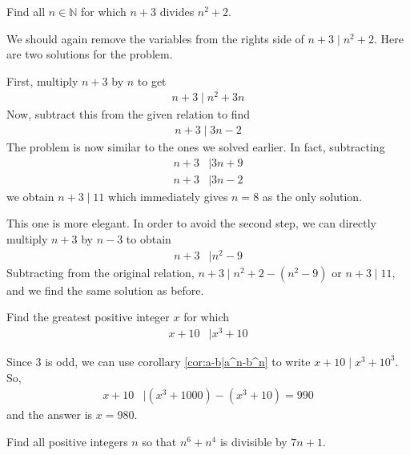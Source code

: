 	\begin{problem}\label{prob:n+3|n^2+2}
		Find all $n\in\mathbb{N}$ for which $n+3$ divides $n^2+2$.
	\end{problem}
We should again remove the variables from the rights side of $n+3\mid n^2+2$. Here are two solutions for the problem.
	\begin{solution}
	 First, multiply $n+3$ by $n$ to get
			\begin{align*}
				n+3 \mid n^2+3n
			\end{align*}
		Now, subtract this from the given relation to find
			\begin{align*}
				n+3 \mid 3n-2
			\end{align*}
		The problem is now similar to the ones we solved earlier. In fact, subtracting
			\begin{align*}
				n+3
					& \mid 3n+9\\
				n+3
					& \mid 3n-2
			\end{align*}
		we obtain $n+3\mid 11$ which immediately gives $n=8$ as the only solution.
	\end{solution}

	\begin{solution}
		This one is more elegant. In order to avoid the second step, we can directly multiply $n+3$ by $n-3$ to obtain
		\begin{align*}
			n+3
				& \mid n^2-9
		\end{align*}
		Subtracting from the original relation, $n+3 \mid n^2+2-(n^2-9)$ or $n+3\mid 11$, and we find the same solution as before.
	\end{solution}

	\begin{problem}
		Find the greatest positive integer $x$ for which
			\begin{align*}
				x+10
					& \mid x^3+10
			\end{align*}
	\end{problem}

	\begin{solution}
		Since $3$ is odd, we can use corollary \eqref{cor:a-b|a^n-b^n} to write $x+10 \mid x^3+10^3$. So,
			\begin{align*}
				x+10
					& \mid (x^3+1000)-(x^3+10)=990
			\end{align*}
		and the answer is $x=980$.
	\end{solution}

	\begin{problem}
		Find all positive integers $n$ so that $n^6+n^4$ is divisible by $7n+1$.
	\end{problem}

